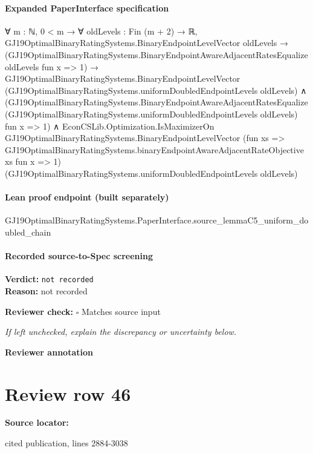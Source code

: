 \documentclass[10pt]{article}
\newcommand{\reviewerbox}{%
  \par\noindent\fbox{\parbox{0.96\linewidth}{\rule{0pt}{0.38in}}}\par
}
\newcommand{\reviewmatch}[1]{%
  \par\noindent\textbf{Reviewer check:} $\square$\; #1\par
  \noindent\emph{If left unchecked, explain the discrepancy or uncertainty below.}\par
}
\begin{document}
\paragraph{Expanded PaperInterface specification}
\begin{ReviewVerbatim}
∀ {m : ℕ},
  0 < m →
    ∀ {oldLevels : Fin (m + 2) → ℝ},
      GJ19OptimalBinaryRatingSystems.BinaryEndpointLevelVector oldLevels →
        (GJ19OptimalBinaryRatingSystems.BinaryEndpointAwareAdjacentRatesEqualize oldLevels fun x => 1) →
          GJ19OptimalBinaryRatingSystems.BinaryEndpointLevelVector
              (GJ19OptimalBinaryRatingSystems.uniformDoubledEndpointLevels oldLevels) ∧
            (GJ19OptimalBinaryRatingSystems.BinaryEndpointAwareAdjacentRatesEqualize
                (GJ19OptimalBinaryRatingSystems.uniformDoubledEndpointLevels oldLevels) fun x => 1) ∧
              EconCSLib.Optimization.IsMaximizerOn GJ19OptimalBinaryRatingSystems.BinaryEndpointLevelVector
                (fun xs => GJ19OptimalBinaryRatingSystems.binaryEndpointAwareAdjacentRateObjective xs fun x => 1)
                (GJ19OptimalBinaryRatingSystems.uniformDoubledEndpointLevels oldLevels)
\end{ReviewVerbatim}

\paragraph{Lean proof endpoint (built separately)}\begin{ReviewVerbatim}
GJ19OptimalBinaryRatingSystems.PaperInterface.source_lemmaC5_uniform_doubled_chain
\end{ReviewVerbatim}

\paragraph{Recorded source-to-Spec screening}
\textbf{Verdict:} \texttt{not recorded}
\\
\textbf{Reason:} not recorded
\reviewmatch{Matches source input}
\noindent\textbf{Reviewer annotation}\par
\reviewerbox
\clearpage
\hypertarget{source-claim-428f19cd38ba7b0a}{}
\section*{Review row 46}
\textbf{Source locator:} {\footnotesize\raggedright cited publication, lines 2884-\allowbreak{}3038\par}
\end{document}
